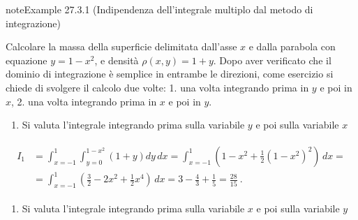 \documentclass[letterpaper,10pt,italian]{jupyterBook}
\begin{document}
\begin{sphinxadmonition}{note}{Example 27.3.1 (Indipendenza dell’integrale multiplo dal metodo di integrazione)}



\sphinxAtStartPar
Calcolare la massa della superficie delimitata dall’asse \(x\) e dalla parabola con equazione \(y = 1 - x^2\), e densità \(\rho(x,y) = 1 + y\). Dopo aver verificato che il dominio di integrazione è semplice in entrambe le direzioni, come esercizio si chiede di svolgere il calcolo due volte: 1. una volta integrando prima in \(y\) e poi in \(x\), 2. una volta integrando prima in \(x\) e poi in \(y\).

\sphinxAtStartPar
{} 
\begin{enumerate}
%
\item {} 
\sphinxAtStartPar
Si valuta l’integrale integrando prima sulla variabile \(y\) e poi sulla variabile \(x\)

\end{enumerate}
\begin{equation*}
\begin{split}\begin{aligned}
I_1 
& = \int_{x=-1}^{1} \int_{y=0}^{1-x^2} \left( 1 + y \right) dy \, dx 
  = \int_{x=-1}^{1} \left( 1-x^2 + \frac{1}{2} (1-x^2)^2 \right) \, dx = \\ 
& = \int_{x=-1}^{1} \left( \frac{3}{2} - 2 x^2 + \frac{1}{2} x^4 \right) \, dx      
  = 3 - \frac{4}{3} + \frac{1}{5} = \frac{28}{15} \ . 
\end{aligned}\end{split}
\end{equation*}

\begin{enumerate}
%
\setcounter{enumi}{1}
\item {} 
\sphinxAtStartPar
Si valuta l’integrale integrando prima sulla variabile \(x\) e poi sulla variabile \(y\)


\end{enumerate}
\end{sphinxadmonition}
\end{document}
